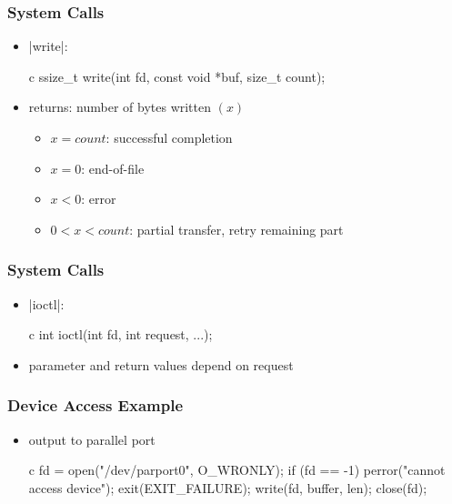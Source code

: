 \documentclass[dvipsnames]{beamer}
\begin{document}
\begin{frame}[fragile]
  \frametitle{System Calls}

  \begin{itemize}
    \item {}|write|:
    \begin{pygments}{c}
ssize_t write(int fd,
              const void *buf,
              size_t count);
    \end{pygments}
    \item returns: number of bytes written $(x)$
    \begin{itemize}
      \item $x=count$: successful completion
      \item $x=0$: end-of-file
      \item $x<0$: error
      \item $0<x<count$: partial transfer, retry remaining part
    \end{itemize}
  \end{itemize}
\end{frame}

\begin{frame}[fragile]
  \frametitle{System Calls}

  \begin{itemize}
    \item {}|ioctl|:
    \begin{pygments}{c}
int ioctl(int fd,
          int request,
          ...);
    \end{pygments}
    \item parameter and return values depend on request
  \end{itemize}
\end{frame}

\begin{frame}[fragile]
  \frametitle{Device Access Example}

  \begin{itemize}
    \item output to parallel port

    \medskip
    \begin{pygments}{c}
fd = open("/dev/parport0", O_WRONLY);
if (fd == -1)
{
    perror("cannot access device");
    exit(EXIT_FAILURE);
}
write(fd, buffer, len);
close(fd);
    \end{pygments}
  \end{itemize}
\end{frame}
%
%
%
%
%
\end{document}
